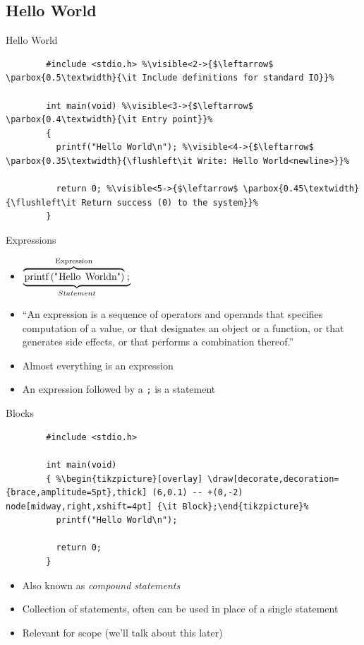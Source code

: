 \documentclass[english,compress]{beamer}
\begin{document}
\subsection{Hello World}
\begin{frame}[fragile]{Hello World}
	\begin{lstlisting}
		#include <stdio.h> %\visible<2->{$\leftarrow$ \parbox{0.5\textwidth}{\it Include definitions for standard IO}}%

		int main(void) %\visible<3->{$\leftarrow$ \parbox{0.4\textwidth}{\it Entry point}}%
		{
		  printf("Hello World\n"); %\visible<4->{$\leftarrow$ \parbox{0.35\textwidth}{\flushleft\it Write: Hello World<newline>}}%

		  return 0; %\visible<5->{$\leftarrow$ \parbox{0.45\textwidth}{\flushleft\it Return success (0) to the system}}%
		}
	\end{lstlisting}
\end{frame}

\begin{frame}[fragile]{Expressions}
	\begin{itemize}
		\item $\underbrace{\overbrace{\text{\lstinline|printf("Hello World\n")|}}^{\text{Expression}}\text{\lstinline|;|}}_{Statement}$
		\item  ``An expression is a sequence of operators
			and operands that specifies computation of a value,
			or that designates an object or a function,
			or that generates side effects, or that
			performs a combination thereof.''
		\item Almost everything is an expression
		\item An expression followed by a \lstinline|;| is a statement
	\end{itemize}

\end{frame}

\begin{frame}[fragile]{Blocks}
	\begin{lstlisting}
		#include <stdio.h>

		int main(void)
		{ %\begin{tikzpicture}[overlay] \draw[decorate,decoration={brace,amplitude=5pt},thick] (6,0.1) -- +(0,-2) node[midway,right,xshift=4pt] {\it Block};\end{tikzpicture}%
		  printf("Hello World\n");

		  return 0;
		}
	\end{lstlisting}
	\begin{itemize}
		\item Also known as \textit{compound statements}
		\item Collection of statements, often can be used in place of a single statement
		\item Relevant for scope (we'll talk about this later)
	\end{itemize}
\end{frame}
\end{document}
